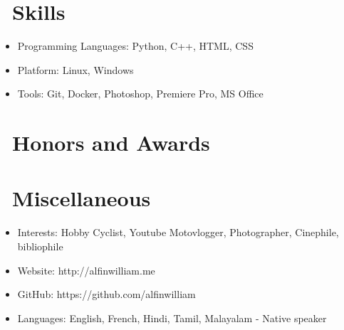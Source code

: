 \documentclass{resume}
\begin{document}

\section{\faCogs\ Skills}
\begin{itemize}[parsep=0.5ex]
  \item Programming Languages: Python, C++, HTML, CSS 
  \item Platform: Linux, Windows
  \item Tools: Git, Docker, Photoshop, Premiere Pro, MS Office
\end{itemize}

\section{\faHeartO\ Honors and Awards}

\section{\faInfo\ Miscellaneous}
\begin{itemize}[parsep=0.5ex]
  \item Interests: Hobby Cyclist, Youtube Motovlogger, Photographer, Cinephile, bibliophile
  \item Website: http://alfinwilliam.me
  \item GitHub: https://github.com/alfinwilliam
  \item Languages: English, French, Hindi, Tamil, Malayalam - Native speaker
\end{itemize}

%
%
\end{document}
